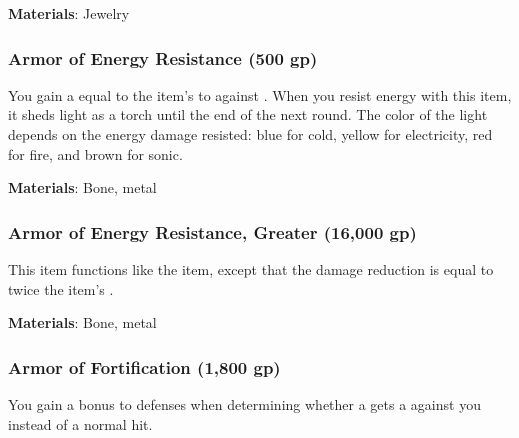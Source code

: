 \vspace{0.25em}
\textbf{Materials}: Jewelry


\lowercase{\hypertarget{item:Armor of Energy Resistance}{}}\label{item:Armor of Energy Resistance}
\hypertarget{item:Armor of Energy Resistance}{\subsubsection{Armor of Energy Resistance\hfill{} (500 gp)}}

You gain a  equal to the item's  to  against .
When you resist energy with this item, it sheds light as a torch until the end of the next round.
The color of the light depends on the energy damage resisted: blue for cold, yellow for electricity, red for fire, and brown for sonic.



\vspace{0.25em}
\textbf{Materials}: Bone, metal


\lowercase{\hypertarget{item:Armor of Energy Resistance, Greater}{}}\label{item:Armor of Energy Resistance, Greater}
\hypertarget{item:Armor of Energy Resistance, Greater}{\subsubsection{Armor of Energy Resistance, Greater\hfill{} (16,000 gp)}}

This item functions like the  item, except that the damage reduction is equal to twice the item's .



\vspace{0.25em}
\textbf{Materials}: Bone, metal


\lowercase{\hypertarget{item:Armor of Fortification}{}}\label{item:Armor of Fortification}
\hypertarget{item:Armor of Fortification}{\subsubsection{Armor of Fortification\hfill{} (1,800 gp)}}

You gain a  bonus to defenses when determining whether a  gets a  against you instead of a normal hit.




